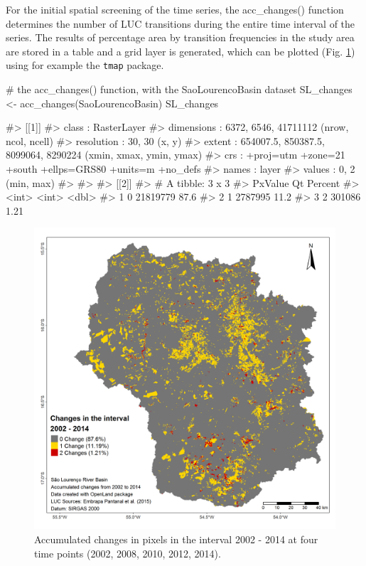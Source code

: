 For the initial spatial screening of the time series, the acc\_changes()
function determines the number of LUC transitions during the entire time
interval of the series. The results of percentage area by transition
frequencies in the study area are stored in a table and a grid layer is
generated, which can be plotted (Fig. \ref{fig:acchange}) using for
example the \texttt{tmap} package.

\begin{Schunk}
\begin{Sinput}
# the acc_changes() function, with the SaoLourencoBasin dataset
SL_changes <- acc_changes(SaoLourencoBasin)
SL_changes
\end{Sinput}
\begin{Soutput}
#> [[1]]
#> class      : RasterLayer 
#> dimensions : 6372, 6546, 41711112  (nrow, ncol, ncell)
#> resolution : 30, 30  (x, y)
#> extent     : 654007.5, 850387.5, 8099064, 8290224  (xmin, xmax, ymin, ymax)
#> crs        : +proj=utm +zone=21 +south +ellps=GRS80 +units=m +no_defs 
#> names      : layer 
#> values     : 0, 2  (min, max)
#> 
#> 
#> [[2]]
#> # A tibble: 3 x 3
#>   PxValue       Qt Percent
#>     <int>    <int>   <dbl>
#> 1       0 21819779   87.6 
#> 2       1  2787995   11.2 
#> 3       2   301086    1.21
\end{Soutput}
\end{Schunk}

\begin{Schunk}
\begin{figure}[h]

{\centering \includegraphics[width=0.7\linewidth,]{figures/acc_mymap.png} 

}

\caption[Accumulated changes in pixels in the interval 2002 - 2014 at four time points (2002, 2008, 2010, 2012, 2014)]{Accumulated changes in pixels in the interval 2002 - 2014 at four time points (2002, 2008, 2010, 2012, 2014).}\label{fig:acchange}
\end{figure}
\end{Schunk}

